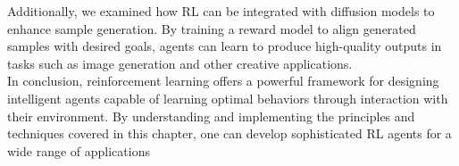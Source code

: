 \noindent Additionally, we examined how RL can be integrated with diffusion models to enhance sample generation. By training a reward model to align generated samples with desired goals, agents can learn to produce high-quality outputs in tasks such as image generation and other creative applications. \\

\noindent In conclusion, reinforcement learning offers a powerful framework for designing intelligent agents capable of learning optimal behaviors through interaction with their environment. By understanding and implementing the principles and techniques covered in this chapter, one can develop sophisticated RL agents for a wide range of applications \\